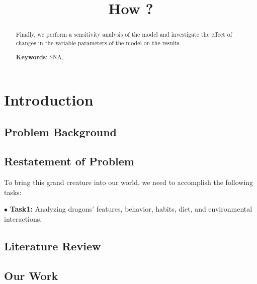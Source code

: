 \documentclass[12pt]{article}  %
\title{How ?}  %
\begin{document}
\begin{abstract}
Finally, we perform a sensitivity analysis of the model and investigate the effect of changes in the variable parameters of the model on the results.

 \noindent\textbf{Keywords}: SNA, 

\end{abstract}

\maketitle  %
\tableofcontents  %


\section{Introduction}
\vspace{-0.5cm}
\subsection{Problem Background}


\vspace{-0.3cm}
\subsection{Restatement of Problem}
\vspace{-0.3cm}

To bring this grand creature into our world, we need to accomplish the following tasks:

$\bullet$ \textbf{Task1: }Analyzing dragons' features, behavior, habits, diet, and environmental interactions.

\vspace{-0.5cm}
\subsection{Literature Review}
\vspace{-0.3cm}


\subsection{Our Work}
\vspace{-0.3cm}


\end{document}
